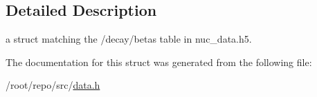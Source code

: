 \subsection{Detailed Description}
a struct matching the \textquotesingle{}/decay/betas\textquotesingle{} table in nuc\+\_\+data.\+h5. 

The documentation for this struct was generated from the following file\+:\begin{DoxyCompactItemize}
\item 
/root/repo/src/\hyperlink{data_8h}{data.\+h}\end{DoxyCompactItemize}
